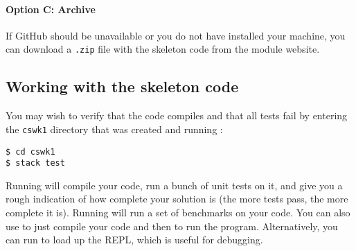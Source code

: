 \paragraph{Option C: Archive} If GitHub should be unavailable or you do not have  installed your machine, you can download a \texttt{\small .zip} file with the skeleton code from the module website.

\subsection{Working with the skeleton code}

You may wish to verify that the code compiles and that all tests fail by entering the \texttt{\small cswk1} directory that was created and running :
\begin{verbatim}
$ cd cswk1
$ stack test
\end{verbatim}
Running  will compile your code, run a bunch of unit tests on it, and give you a rough indication of how complete your solution is (the more tests pass, the more complete it is). Running  will run a set of benchmarks on your code. You can also use  to just compile your code and then  to run the program. Alternatively, you can run  to load up the REPL, which is useful for debugging.

